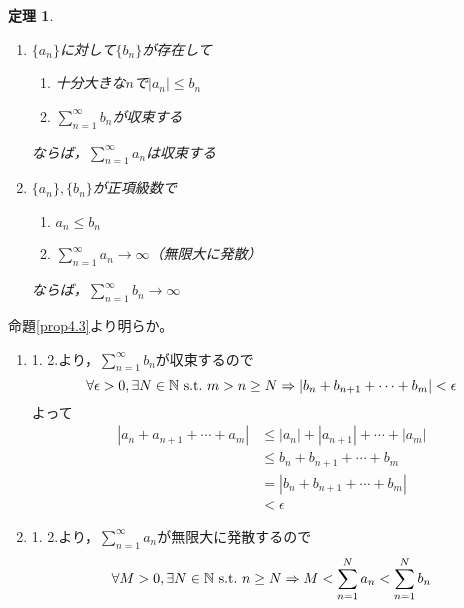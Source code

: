 \documentclass[dvipdfmx,a4j,10pt]{jsarticle}
\makeatletter
\theoremstyle{mystyle1}
\newtheorem{thm}[dfn]{定理}
\theoremstyle{mystyle2}
\renewenvironment{proof}[1][\proofname]{\par
  \pushQED{\qed}%
  \normalfont
  \topsep6\p@\@plus6\p@ \trivlist
  \item[\hskip\labelsep{\bfseries\sffamily #1}]\ignorespaces
}{%
  \popQED\endtrivlist\@endpefalse
}
\renewcommand\proofname{証明}
\makeatother
\begin{document}


\newpage

\begin{framed}
    \begin{thm}\label{thm4.4}　
    \begin{enumerate}
    \renewcommand{\labelenumi}{\Roman{enumi}.}
    \item $\{a_n\}$に対して$\{b_n\}$が存在して
    	\begin{enumerate}
    	\renewcommand{\labelenumii}{\arabic{enumii}.}
    		\item 十分大きな$n$で$|a_n|\leq b_n$
    		\item $\displaystyle \sum_{n=1}^{\infty}b_n$が収束する
    	\end{enumerate}
    	ならば，$\displaystyle\sum_{n=1}^{\infty}a_n$は収束する\footnotemark
    \item $\{a_n\},\{b_n\}$が正項級数\footnotemark  で
    	\begin{enumerate}
    	\renewcommand{\labelenumii}{\arabic{enumii}.}
    		\item $a_n\leq b_n$
    		\item $\displaystyle \sum_{n=1}^{\infty}a_n\to\infty$（無限大に発散）
    	\end{enumerate}
    	ならば，$\displaystyle\sum_{n=1}^{\infty}b_n\to\infty$
    \end{enumerate}
    \end{thm}
\end{framed}
\begin{proof}[定理\ref{thm4.4}の証明]
    命題\ref{prop4.3}より明らか。
    \begin{enumerate}
    \renewcommand{\labelenumi}{\Roman{enumi}.}
    \item 1. 2.より，$\displaystyle \sum_{n=1}^{\infty}b_n$が収束するので
    	\[\forall\epsilon>0,\exists N\in\mathbb{N}\ {\rm s.t.}\ m>n\geq N\Rightarrow |b_n+b_{n+1}+\cdots+b_m|<\epsilon\]
    	よって
    	\[
    	\begin{split}
    		|a_n+a_{n+1}+\cdots+a_m|&\leq |a_n|+|a_{n+1}|+\cdots+|a_m|\\
    		&\leq b_n+b_{n+1}+\cdots+b_m\\
    		&=|b_n+b_{n+1}+\cdots+b_m|\\
    		&<\epsilon
    	\end{split}
    	\]
    \item 1. 2.より，$\displaystyle \sum_{n=1}^{\infty}a_n$が無限大に発散するので
    \[\forall M>0,\exists N\in\mathbb{N}\ {\rm s.t.}\ n\geq N\Rightarrow M<\sum_{n=1}^N a_n<\sum_{n=1}^N b_n\]
    \end{enumerate}
\end{proof}
\newpage
\end{document}
